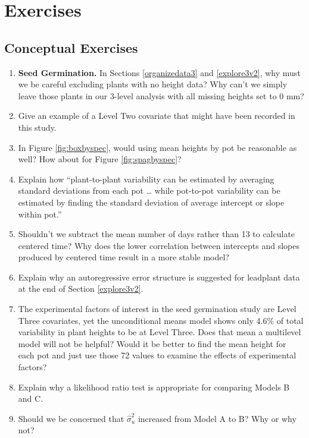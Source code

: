\documentclass[
]{krantz}
\begin{document}
\hypertarget{exercises}{%
\section{Exercises}\label{exercises}}

\hypertarget{conceptual-exercises}{%
\subsection{Conceptual Exercises}\label{conceptual-exercises}}

\begin{enumerate}
\def\labelenumi{\arabic{enumi}.}
\item
  \textbf{Seed Germination.} In Sections \ref{organizedata3} and \ref{explore3v2}, why must we be careful excluding plants with no height data? Why can't we simply leave those plants in our 3-level analysis with all missing heights set to 0 mm?
\item
  Give an example of a Level Two covariate that might have been recorded in this study.
\item
  In Figure \ref{fig:boxbyspec}, would using mean heights by pot be reasonable as well? How about for Figure \ref{fig:spagbyspec}?
\item
  Explain how ``plant-to-plant variability can be estimated by averaging standard deviations from each pot \ldots{} while pot-to-pot variability can be estimated by finding the standard deviation of average intercept or slope within pot.''
\item
  Shouldn't we subtract the mean number of days rather than 13 to calculate centered time? Why does the lower correlation between intercepts and slopes produced by centered time result in a more stable model?
\item
  Explain why an autoregressive error structure is suggested for leadplant data at the end of Section \ref{explore3v2}.
\item
  The experimental factors of interest in the seed germination study are Level Three covariates, yet the unconditional means model shows only 4.6\% of total variability in plant heights to be at Level Three. Does that mean a multilevel model will not be helpful? Would it be better to find the mean height for each pot and just use those 72 values to examine the effects of experimental factors?
\item
  Explain why a likelihood ratio test is appropriate for comparing Models B and C.
\item
  Should we be concerned that \(\hat{\sigma}_{u}^{2}\) increased from Model A to B? Why or why not?

\end{enumerate}
\end{document}
